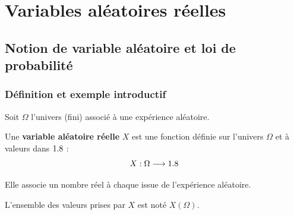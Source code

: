 \chapter{Variables aléatoires réelles}

\section{Notion de variable aléatoire et loi de probabilité}

\subsection{Définition et exemple introductif}

\begin{defin}
	Soit $\Omega$ l'univers (fini) associé à une expérience aléatoire.

	Une \textbf{variable aléatoire réelle} $X$ est une fonction définie sur l'univers $\Omega$ et à valeurs dans $1.8$ :
	\[
		X : \Omega \longrightarrow 1.8
	\]

	Elle associe un nombre réel à chaque issue de l'expérience aléatoire.

	L'ensemble des valeurs prises par $X$ est noté $X(\Omega)$.
\end{defin}

